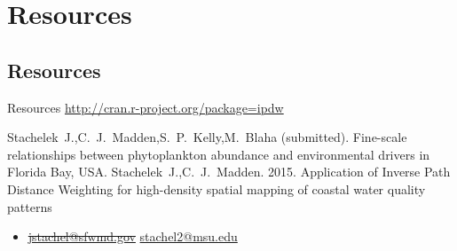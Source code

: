 \documentclass[compress,noflama,nosectionpages]{beamer}
\begin{document}
\section{Resources}
\subsection{Resources}
\begin{frame}{Resources}
  \centering
  \url{http://cran.r-project.org/package=ipdw}
  \begin{thebibliography}{10}
  \beamertemplatearticlebibitems
	Stachelek~J.,C.~J.~Madden,S.~P.~Kelly,M.~Blaha (submitted). Fine-scale relationships between phytoplankton abundance and environmental drivers in Florida Bay, USA.
	\newblock {}
	Stachelek~J.,C.~J.~Madden. 2015. Application of Inverse Path Distance Weighting for high-density spatial mapping of coastal water quality patterns
	\newblock {}
  \end{thebibliography}

	\begin{itemize}
		\item \sout{\url{jstachel@sfwmd.gov}} \url{stachel2@msu.edu}
	\end{itemize}
\end{frame}
\end{document}
